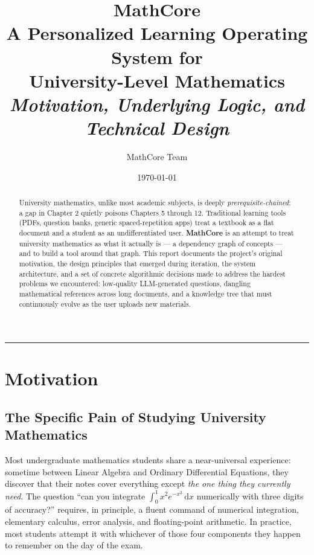 \documentclass[11pt,a4paper]{article}
\title{\vspace{-2em}%
  \color{mcslate}\textbf{\Large MathCore}\\[0.3em]
  \large A Personalized Learning Operating System for\\
  \large University-Level Mathematics\\[0.6em]
  \normalsize\color{mcslate!70}
  \textit{Motivation, Underlying Logic, and Technical Design}
}
\author{MathCore Team}
\date{\today}
\begin{document}
\maketitle
\thispagestyle{empty}

\begin{abstract}
\noindent
University mathematics, unlike most academic subjects, is deeply \emph{prerequisite-chained}: a gap in Chapter 2 quietly poisons Chapters 5 through 12. Traditional learning tools (PDFs, question banks, generic spaced-repetition apps) treat a textbook as a flat document and a student as an undifferentiated user. \textbf{MathCore} is an attempt to treat university mathematics as what it actually is --- a dependency graph of concepts --- and to build a tool around that graph.
This report documents the project's original motivation, the design principles that emerged during iteration, the system architecture, and a set of concrete algorithmic decisions made to address the hardest problems we encountered: low-quality LLM-generated questions, dangling mathematical references across long documents, and a knowledge tree that must continuously evolve as the user uploads new materials.
\end{abstract}

\tableofcontents
\vspace{1em}
\hrule
\vspace{1em}

\section{Motivation}
\label{sec:motivation}

\subsection{The Specific Pain of Studying University Mathematics}

Most undergraduate mathematics students share a near-universal experience: sometime between Linear Algebra and Ordinary Differential Equations, they discover that their notes cover everything except \emph{the one thing they currently need}. The question ``can you integrate $\int_0^1 x^2 e^{-x^2}\,\mathrm{d}x$ numerically with three digits of accuracy?'' requires, in principle, a fluent command of numerical integration, elementary calculus, error analysis, and floating-point arithmetic. In practice, most students attempt it with whichever of those four components they happen to remember on the day of the exam.
\end{document}
